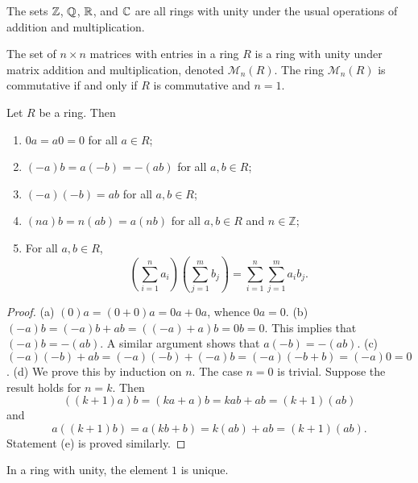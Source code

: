\begin{example}
    The sets \(\mathbb{Z}\), \(\mathbb{Q}\), \(\mathbb{R}\), and \(\mathbb{C}\) are all rings with unity under
    the usual operations of addition and multiplication.
\end{example}

\begin{example}
    The set of \(n \times n\) matrices with entries in a ring \(R\) is a ring
    with unity under matrix addition and multiplication, denoted
    \(\mathcal{M}_n(R)\). The ring \(\mathcal{M}_n(R)\) is commutative if and
    only if \(R\) is commutative and \(n = 1\).
\end{example}

\begin{theorem}
    Let \(R\) be a ring. Then
    \begin{enumerate}[label=(\alph*)]
        \item \(0a = a0 = 0\) for all \(a \in R\);
        \item \((-a)b = a(-b) = -(ab)\) for all \(a, b \in R\);
        \item \((-a)(-b) = ab\) for all \(a, b \in R\);
        \item \((na)b = n(ab) = a(nb)\) for all \(a, b \in R\) and \(n \in
        \mathbb{Z}\);
        \item For all \(a, b \in R\),
        \[
            \left(\sum_{i=1}^{n} a_i\right)\left(\sum_{j=1}^{m} b_j\right) = \sum_{i=1}^{n} \sum_{j=1}^{m} a_i b_j.
        \]
    \end{enumerate}
\end{theorem}

\begin{proof}
    (a) \((0)a = (0 + 0)a = 0a + 0a\), whence \(0a = 0\). (b) \((-a)b = (-a)b +
    ab = ((-a) + a)b = 0b = 0\). This implies that \((-a)b = -(ab)\). A similar
    argument shows that \(a(-b) = -(ab)\). (c) \((-a)(-b) + ab = (-a)(-b) +
    (-a)b = (-a)(-b + b) = (-a)0 = 0\). (d) We prove this by induction on \(n\).
    The case \(n = 0\) is trivial. Suppose the result holds for \(n = k\). Then
    \[
        ((k + 1)a)b = (ka + a)b = kab + ab = (k+1)(ab)
    \]
    and
    \[
        a((k + 1)b) = a(kb + b) = k(ab) + ab = (k+1)(ab).
    \]
    Statement (e) is proved similarly.
\end{proof}

\begin{theorem}
    In a ring with unity, the element \(1\) is unique.
\end{theorem}

